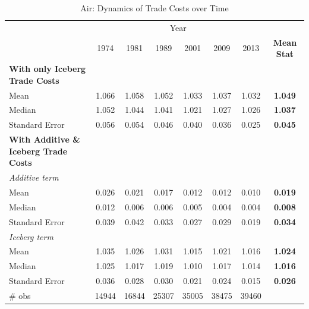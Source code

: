 \documentclass[a4paper,11pt]{article}
\begin{document}
\begin{table}[htbp]
  \centering
  \caption{Air: Dynamics of Trade Costs over Time}
\begin{center}
    \begin{tabular}{lccccccc}

   \hline\hline
          & \multicolumn{6}{c}{Year}                      &  \\


& 1974  & 1981  & 1989  & 2001  & 2009  & 2013  & \textbf{Mean Stat}\\

\hline
\textbf{With only Iceberg Trade Costs} &       &       &       &       &       &       &  \\
Mean  & 1.066 & 1.058 & 1.052 & \multicolumn{1}{c}{1.033} & \multicolumn{1}{c}{1.037} & \multicolumn{1}{c}{1.032} & \multicolumn{1}{c}{\textbf{1.049}} \\
Median & 1.052 & 1.044 & 1.041 & \multicolumn{1}{c}{1.021} & \multicolumn{1}{c}{1.027} & \multicolumn{1}{c}{1.026} & \multicolumn{1}{c}{\textbf{1.037}} \\
Standard Error & 0.056 & 0.054 & 0.046 & \multicolumn{1}{c}{0.040} & \multicolumn{1}{c}{0.036} & \multicolumn{1}{c}{0.025} & \multicolumn{1}{c}{\textbf{0.045}} \\
\hline
\textbf{With Additive \& Iceberg Trade Costs } &       &       &       &       &       &       & \textbf{} \\
\textit{Additive term} &       &       &       &       &       &       & \multicolumn{1}{c}{\textbf{}} \\
Mean  & 0.026 & 0.021 & 0.017 & \multicolumn{1}{c}{0.012} & \multicolumn{1}{c}{0.012} & \multicolumn{1}{c}{0.010} & \multicolumn{1}{c}{\textbf{0.019}} \\
Median & 0.012 & 0.006 & 0.006 & \multicolumn{1}{c}{0.005} & \multicolumn{1}{c}{0.004} & \multicolumn{1}{c}{0.004} & \multicolumn{1}{c}{\textbf{0.008}} \\
Standard Error & 0.039 & 0.042 & 0.033 & \multicolumn{1}{c}{0.027} & \multicolumn{1}{c}{0.029} & \multicolumn{1}{c}{0.019} & \multicolumn{1}{c}{\textbf{0.034}} \\
\textit{Iceberg term} &       &       &       &       &       &       & \textbf{} \\
Mean  & 1.035 & 1.026 & 1.031 & \multicolumn{1}{c}{1.015} & \multicolumn{1}{c}{1.021} & \multicolumn{1}{c}{1.016} & \multicolumn{1}{c}{\textbf{1.024}} \\
Median & 1.025 & 1.017 & 1.019 & \multicolumn{1}{c}{1.010} & \multicolumn{1}{c}{1.017} & \multicolumn{1}{c}{1.014} & \multicolumn{1}{c}{\textbf{1.016}} \\
Standard Error & 0.036 & 0.028 & 0.030 & \multicolumn{1}{c}{0.021} & \multicolumn{1}{c}{0.024} & \multicolumn{1}{c}{0.015} & \multicolumn{1}{c}{\textbf{0.026}} \\
\hline
\# obs & 14944 & 16844 & 25307 & \multicolumn{1}{c}{35005} & \multicolumn{1}{c}{38475} & \multicolumn{1}{c}{39460} & \multicolumn{1}{c}{\textbf{}} \\


\end{tabular}
\end{center}
\end{table}
\end{document}
